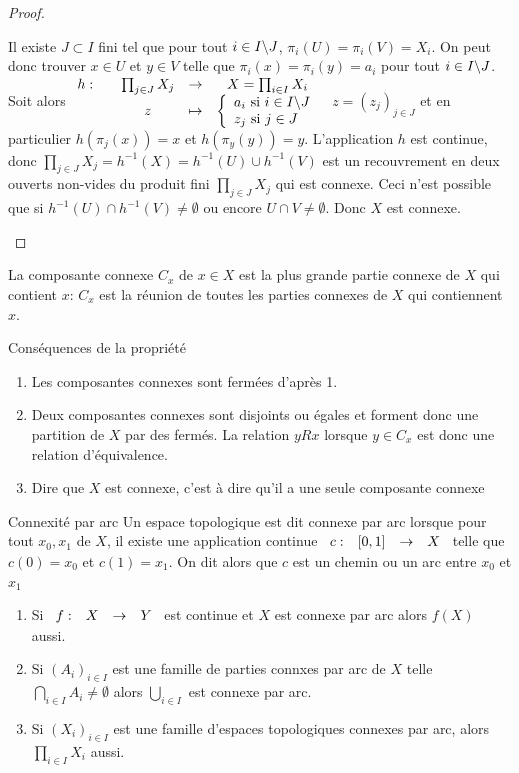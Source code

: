 \documentclass[]{report}
\begin{document}
\begin{proof}
\begin{enumerate}
            Il existe $J\subset I$ fini tel que pour tout $i\in I\backslash J$, $\pi_i(U)=\pi_i(V)=X_i$. On peut donc trouver $x\in U$ et $y\in V$ telle que $\pi_i(x)=\pi_i(y)=a_i$ pour tout $i\in I\backslash J$. Soit alors $\begin{array}{ccccc} h : & & \prod_{j\in J}X_j & \to & X=\prod_{i\in I}X_i \\ & & z & \mapsto & \left\{\begin{array}{ll} a_i \text{ si $i\in I\backslash J$}\\ z_j\text{ si }j\in J \end{array} \right. \end{array}$ $z=(z_j)_{j\in J}$ et en particulier $h(\pi_j(x))=x$ et $h(\pi_y(y))=y$. L'application $h$ est continue, donc $\prod_{j\in J} X_j=h^{-1}(X)=h^{-1}(U)\cup h^{-1}(V)$ est un recouvrement en deux ouverts non-vides du produit fini $\prod_{j\in J} X_j$ qui est connexe. Ceci n'est possible que si $h^{-1}(U)\cap h^{-1}(V)\neq \emptyset$ ou encore $U\cap V\neq \emptyset$. Donc $X$ est connexe. 
        \end{enumerate}
    \end{proof}

    \begin{df}{}{}
        La composante connexe $C_x$ de $x\in X$ est la plus grande partie connexe de $X$ qui contient $x$: $C_x$ est la réunion de toutes les parties connexes de $X$ qui contiennent $x$.
    \end{df}

    \begin{re}{}{}
        Conséquences de la propriété
        \begin{enumerate}
            \item Les composantes connexes sont fermées d'après 1.
            \item Deux composantes connexes sont disjoints ou égales et forment donc une partition de $X$ par des fermés. La relation $y Rx$ lorsque $y\in C_x$ est donc une relation d'équivalence.
            \item Dire que $X$ est connexe, c'est à dire qu'il a une seule composante connexe
        \end{enumerate}
    \end{re}

    \begin{df}{Connexité par arc}{}
        Un espace topologique est dit connexe par arc lorsque pour tout $x_0,x_1$ de $X$, il existe une application continue $\begin{array}{ccccc} c : & [0,1] & \to & X \end{array}$ telle que $c(0)=x_0$ et $c(1)=x_1$. On dit alors que $c$ est un chemin ou un arc entre $x_0$ et $x_1$
    \end{df}

    \begin{prop}{}{}
        \begin{enumerate}
            \item Si $\begin{array}{ccccc} f : & X & \to & Y \end{array}$ est continue et $X$ est connexe par arc alors $f(X)$ aussi.
            \item Si $(A_i)_{i\in I}$ est une famille de parties connxes par arc de $X$ telle $\bigcap_{i\in I}A_i\neq \emptyset$ alors $\bigcup_{i\in I}$ est connexe par arc.
            \item Si $(X_i)_{i\in I}$ est une famille d'espaces topologiques connexes par arc, alors $\prod_{i\in I}X_i$ aussi.
        \end{enumerate}
    \end{prop}
\end{document}
